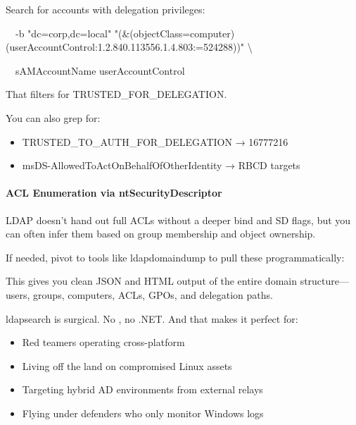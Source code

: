 Search for accounts with delegation privileges:


  -b "dc=corp,dc=local" "(\&(objectClass=computer)(userAccountControl:1.2.840.113556.1.4.803:=524288))" \textbackslash{}

  sAMAccountName userAccountControl

That filters for TRUSTED\_FOR\_DELEGATION.

You can also grep for:

\begin{itemize}
    \item TRUSTED\_TO\_AUTH\_FOR\_DELEGATION → 16777216

    \item msDS-AllowedToActOnBehalfOfOtherIdentity → RBCD targets

\end{itemize}

\paragraph{\textbf{ACL Enumeration via }\textbf{ntSecurityDescriptor}}

LDAP doesn’t hand out full ACLs without a deeper bind and SD flags, but you can often infer them based on group membership and object ownership.

If needed, pivot to tools like ldapdomaindump to pull these programmatically:


This gives you clean JSON and HTML output of the entire domain structure—users, groups, computers, ACLs, GPOs, and delegation paths.

ldapsearch is surgical. No  , no .NET. And that makes it perfect for:

\begin{itemize}
    \item Red teamers operating cross-platform
    \item Living off the land on compromised Linux assets
    \item Targeting hybrid AD environments from external relays
    \item Flying under defenders who only monitor Windows logs

\end{itemize}

